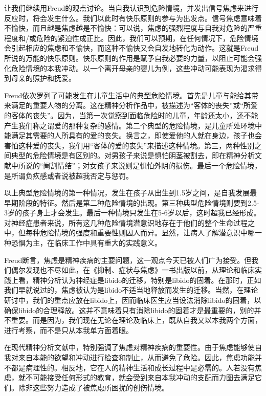 \documentclass[UTF8,10pt,a4paper,openany]{book}
\begin{document}
让我们继续用Freud的观点讨论。当自我认识到危险情境，并发出信号焦虑来进行反应时，将会发生什么。我们以此时有快乐原则的参与为出发点。信号焦虑意味着不愉快，而且越是焦虑越是不愉快：可以说，焦虑的强烈程度与自我对危险的严重程度和/或危险的紧迫性成正比。因此，我们可以预期，在任何情况下，危险情境会引起相应的焦虑和不愉快，而这种不愉快又会自发地转化为动作。这就是Freud所说的万能的快乐原则。快乐原则的作用是赋予自我必要的力量，以阻止可能会强化危险情境的本我冲动。以一个离开母亲的婴儿为例，这些冲动可能表现为渴求得到母亲的照护和抚爱。

Freud依次罗列了可能发生在儿童生活中的典型危险情境。首先是儿童与能给其带来满足的重要人物的分离。这在精神分析作品中，被描述为“客体的丧失”或“所爱的客体的丧失”。因为，当第一次觉察到面临危险时的儿童，年龄还太小，还不能产生我们称之谓爱的那种复杂的感情。第二个典型的危险情境，是儿童所处环境中能满足其需要的人所具有的爱的丧失。换言之，即使爱他的人就在身边，孩子也会害怕这种爱的丧失，我们用“客体的爱的丧失”来描述这种情境。第三，两种性别之间典型的危险情境是有区别的。对男孩子来说是惧怕阴茎被割去，即在精神分析文献中所说的“阉割情结”；对女孩子来说则是惧怕外阴的损伤。最后一个危险情境，是所谓负疚感或者说被超我否定与惩罚。

以上典型危险情境的第一种情况，发生在孩子从出生到1.5岁之间，是自我发展最早期阶段的特征。然后是第二种危险情境的出现。第三种典型危险情境则要到2.5-3岁的孩子身上才会发生。最后一种情境只发生在5-6岁以后，这时超我已经形成。对神经症患者来说，所有这几种危险情境潜意识地存在于他们的整个生命过程之中，但每种危险情境的强度和重要性则因人而异。显然，让病人了解潜意识中哪一种恐惧为主，在临床工作中具有重大的实践意义。

Freud断言，焦虑是精神疾病的主要问题，这一观点今天已被人们广为接受。但我们偶尔发现也不尽如此，在《抑制、症状与焦虑》一书出版以前，从理论和临床实践上看，精神分析认为神经症是libido的迁移，特别是libido的固着。在那时，正如我们早就说过的，焦虑被认为是libido不适当地释放而发生的迁移。当然，在理论研讨中，我们的重点应放在libido上，因而临床医生应当设法消除libido的固着，以确保libido的合理释放。这并不意味着只有消除libido的固着才是最重要的，别的并不重要。而是因为，我们现在无论在理论及临床上，既从自我又以本我两个方面，进行考察，而不是只从本我单方面着眼。

在现代精神分析文献中，特别强调了焦虑对精神疾病的重要性。由于焦虑能够使自我对来自本能的欲望和冲动进行检查和制止，从而避免了危险。因此，焦虑功能并不都是病理性的。相反地，它在人的精神生活和成长过程中是必需的。人若没有焦虑，就不可能接受任何形式的教育，就会受到来自本我冲动的支配而力图去满足它们。除非这些努力造成了被焦虑所困扰的创伤情境。
\end{document}
